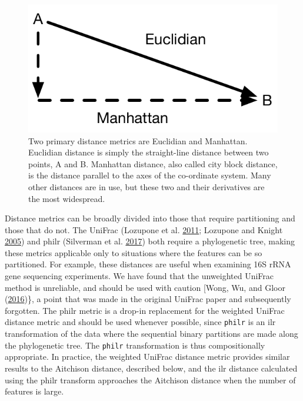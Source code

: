 \documentclass[onecolumn]{book}
\theoremstyle{definition}
\theoremstyle{definition}
\theoremstyle{definition}
\theoremstyle{remark}
\begin{document}
\begin{figure}
\centering
\includegraphics{./figs/distance.pdf}
\caption{Two primary distance metrics are Euclidian and Manhattan.
Euclidian distance is simply the straight-line distance between two
points, A and B. Manhattan distance, also called city block distance, is
the distance parallel to the axes of the co-ordinate system. Many other
distances are in use, but these two and their derivatives are the most
widespread.}
\end{figure}

Distance metrics can be broadly divided into those that require
partitioning and those that do not. The UniFrac (Lozupone et al.
\protect\hyperlink{ref-Lozupone:2011aa}{2011}; Lozupone and Knight
\protect\hyperlink{ref-unifrac:2005}{2005}) and philr (Silverman et al.
\protect\hyperlink{ref-Silverman:2017aa}{2017}) both require a
phylogenetic tree, making these metrics applicable only to situations
where the features can be so partitioned. For example, these distances
are useful when examining 16S rRNA gene sequencing experiments. We have
found that the unweighted UniFrac method is unreliable, and should be
used with caution {[}Wong, Wu, and Gloor
(\protect\hyperlink{ref-Wong:2016aa}{2016})\}, a point that was made in
the original UniFrac paper and subsequently forgotten. The philr metric
is a drop-in replacement for the weighted UniFrac distance metric and
should be used whenever possible, since \texttt{philr} is an ilr
transformation of the data where the sequential binary partitions are
made along the phylogenetic tree. The \texttt{philr} transformation is
thus compositionally appropriate. In practice, the weighted UniFrac
distance metric provides similar results to the Aitchison distance,
described below, and the ilr distance calculated using the philr
transform approaches the Aitchison distance when the number of features
is large.
\end{document}
